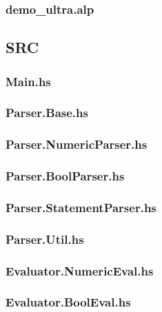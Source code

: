 \documentclass[a4paper,10pt]{article}
\begin{document}
    \subsubsection{demo\_ultra.alp}
      
  \subsection{SRC}
    \subsubsection{Main.hs}
      
    \subsubsection{Parser.Base.hs}
      
    \subsubsection{Parser.NumericParser.hs}
      
    \subsubsection{Parser.BoolParser.hs}
      
    \subsubsection{Parser.StatementParser.hs}
      
    \subsubsection{Parser.Util.hs}
      
    \subsubsection{Evaluator.NumericEval.hs}
      
    \subsubsection{Evaluator.BoolEval.hs}
      
\end{document}
